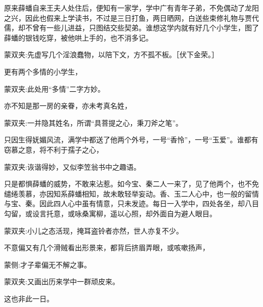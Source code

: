 \begin{parag}
    原来薛蟠自来王夫人处住后，便知有一家学，学中广有青年子弟，不免偶动了龙阳之兴，因此也假来上学读书，不过是三日打鱼，两日晒网，白送些束修礼物与贾代儒，却不曾有一些儿进益，只图结交些契弟。谁想这学内就有好几个小学生，图了薛蟠的银钱吃穿，被他哄上手的，也不消多记。\begin{note}蒙双夹:先虚写几个淫浪蠢物，以陪下文，方不孤不板。［伏下金荣。］\end{note}更有两个多情的小学生，\begin{note}蒙双夹:此处用“多情”二字方妙。\end{note}亦不知是那一房的亲眷，亦未考真名姓，\begin{note}蒙双夹:一并隐其姓名，所谓“具菩提之心，秉刀斧之笔”。\end{note}只因生得妩媚风流，满学中都送了他两个外号，一号“香怜”，一号“玉爱”。谁都有窃慕之意，将不利于孺子之心，\begin{note}蒙双夹:诙谐得妙，又似李笠翁书中之趣语。\end{note}只是都惧薛蟠的威势，不敢来沾惹。如今宝、秦二人一来了，见了他两个，也不免缱绻羡慕，亦因知系薛蟠相知，故未敢轻举妄动。香、玉二人心中，也一般的留情与宝、秦。因此四人心中虽有情意，只未发迹。每日一入学中，四处各坐，却八目勾留，或设言托意，或咏桑寓柳，遥以心照，却外面自为避人眼目。\begin{note}蒙双夹:小儿之态活现，掩耳盗铃者亦然，世人亦复不少。\end{note}不意偏又有几个滑贼看出形景来，都背后挤眉弄眼，或咳嗽扬声，\begin{note}蒙侧:才子辈偏无不解之事。\end{note}\begin{note}蒙双夹:又画出历来学中一群顽皮来。\end{note}这也非此一日。
\end{parag}


